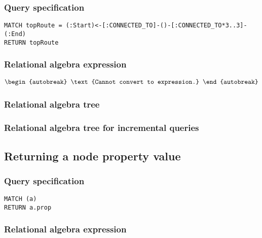 \subsubsection*{Query specification}

\begin{lstlisting}
MATCH topRoute = (:Start)<-[:CONNECTED_TO]-()-[:CONNECTED_TO*3..3]-(:End)
RETURN topRoute
\end{lstlisting}

\subsubsection*{Relational algebra expression}

\begin{align*}
\begin{autobreak}
\text{Cannot convert to expression.}
\end{autobreak}
\end{align*}

\subsubsection*{Relational algebra tree}


\subsubsection*{Relational algebra tree for incremental queries}


\subsection{Returning a node property value}

\subsubsection*{Query specification}

\begin{lstlisting}
MATCH (a)
RETURN a.prop
\end{lstlisting}

\subsubsection*{Relational algebra expression}

